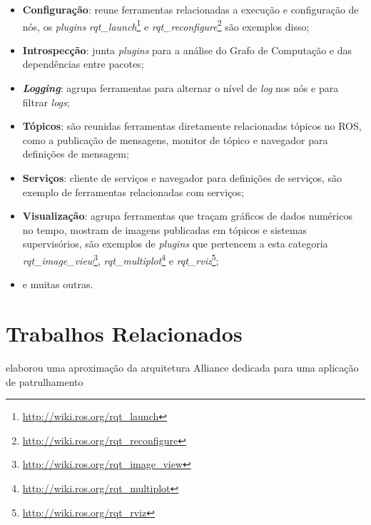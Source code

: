             \begin{itemize}
                \item \textbf{Configuração}: reune ferramentas relacionadas a execução e configuração de nós, os \textit{plugins} \textit{rqt\_launch}\footnote{\url{http://wiki.ros.org/rqt_launch}} e \textit{rqt\_reconfigure}\footnote{\url{http://wiki.ros.org/rqt_reconfigure}} são exemplos disso;
                
                \item \textbf{Introspecção}: junta \textit{plugins} para a análise do Grafo de Computação e das dependências entre pacotes;
                
                \item \textbf{\textit{Logging}}: agrupa ferramentas para alternar o nível de \textit{log} nos nós e para filtrar \textit{logs};
                
                \item \textbf{Tópicos}: são reunidas ferramentas diretamente relacionadas tópicos no ROS, como a publicação de mensagens, monitor de tópico e navegador para definições de mensagem;
                
                \item \textbf{Serviços}: cliente de serviços e navegador para definições de serviços, são exemplo de ferramentas relacionadas com serviços;
                
                \item \textbf{Visualização}: agrupa ferramentas que traçam gráficos de dados numéricos no tempo, mostram de imagens publicadas em tópicos e sistemas supervisórios, são exemplos de \textit{plugins} que pertencem a esta categoria \textit{rqt\_image\_view}\footnote{\url{http://wiki.ros.org/rqt_image_view}}, \textit{rqt\_multiplot}\footnote{\url{http://wiki.ros.org/rqt_multiplot}} e \textit{rqt\_rviz}\footnote{\url{http://wiki.ros.org/rqt_rviz}};
                
                \item e muitas outras.
            \end{itemize}
        
    \section{Trabalhos Relacionados} \label{sec:trabalhos_relacionados}
         elaborou uma aproximação da arquitetura Alliance dedicada para uma aplicação de patrulhamento